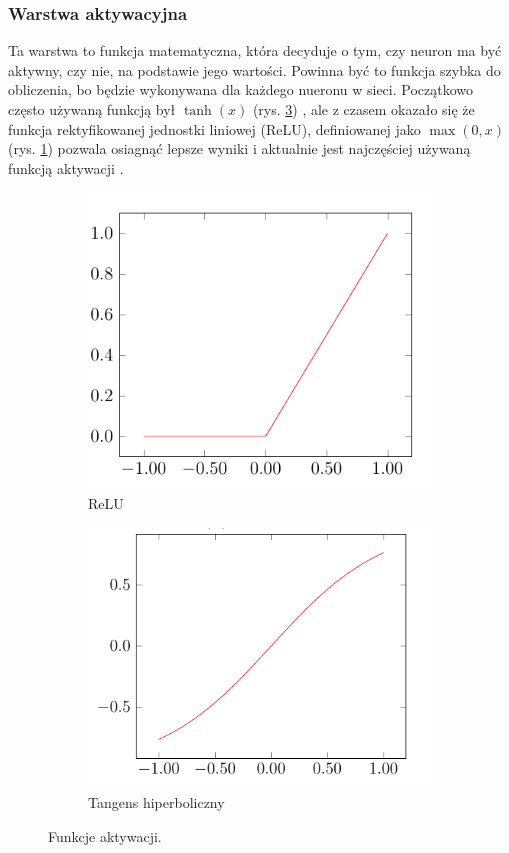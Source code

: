 \documentclass[a4paper,twoside,12pt]{book}
\begin{document}
{\subsubsection{Warstwa aktywacyjna}
{Ta warstwa to funkcja matematyczna, która decyduje o tym, czy neuron ma być aktywny, czy nie, na podstawie jego wartości. Powinna być to funkcja szybka do obliczenia, bo będzie wykonywana dla każdego nueronu w sieci. Początkowo często używaną funkcją był $\tanh(x)$ (rys. \ref {tanh}) , ale z czasem okazało się że funkcja rektyfikowanej jednostki liniowej (ReLU), definiowanej jako $\max(0,x)$(rys. \ref{ReLu}) pozwala osiagnąć lepsze wyniki \cite{nair2010rectified,glorot2011deep} i aktualnie jest najczęściej używaną funkcją aktywacji \cite{ramachandran2017searching}.}



\begin{figure}
\centering
\begin{subfigure}{.5\textwidth}
  \centering
  \includegraphics[width=.8\linewidth]{relu.png}
  \caption{ReLU}
  \label{ReLu}
\end{subfigure}%
\begin{subfigure}{.5\textwidth}
  \centering
  \includegraphics[width=.8\linewidth]{tanges.png}
  \caption{Tangens hiperboliczny}
  \label{tanh}
\end{subfigure}
\caption{Funkcje aktywacji.}
\end{figure}


}
\end{document}
